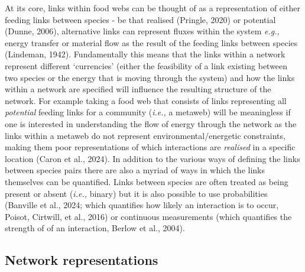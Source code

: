 \documentclass[
]{article}
\begin{document}
At its core, links within food webs can be thought of as a
representation of either feeding links between species - be that
realised (Pringle, 2020) or potential (Dunne, 2006), alternative links
can represent fluxes within the system \emph{e.g.,} energy transfer or
material flow as the result of the feeding links between species
(Lindeman, 1942). Fundamentally this means that the links within a
network represent different `currencies' (either the feasibility of a
link existing between two species or the energy that is moving through
the system) and how the links within a network are specified will
influence the resulting structure of the network. For example taking a
food web that consists of links representing all \emph{potential}
feeding links for a community (\emph{i.e.,} a metaweb) will be
meaningless if one is interested in understanding the flow of energy
through the network as the links within a metaweb do not represent
environmental/energetic constraints, making them poor representations of
which interactions are \emph{realised} in a specific location (Caron et
al., 2024). In addition to the various ways of defining the links
between species pairs there are also a myriad of ways in which the links
themselves can be quantified. Links between species are often treated as
being present or absent (\emph{i.e.,} binary) but it is also possible to
use probabilities (Banville et al., 2024; which quantifies how likely an
interaction is to occur, Poisot, Cirtwill, et al., 2016) or continuous
measurements (which quantifies the strength of of an interaction, Berlow
et al., 2004).

\subsection{Network representations}\label{network-representations}
\end{document}
